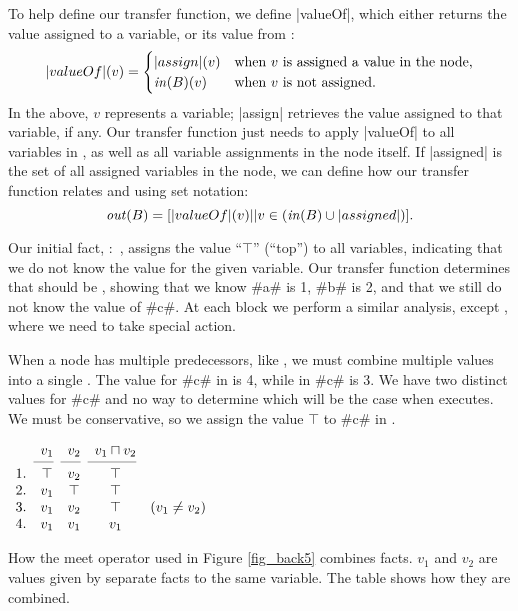 \documentclass[12pt]{report}
\begin{document}
To help define our transfer function, we define |valueOf|,
which either returns the value assigned to a variable, or its value
from \inBa:
\begin{equation} |valueOf|(v) = 
  \begin{cases}
    |assign|(v) & \text{when $v$ is assigned a value in the node,} \\
    \text{\ensuremath{\mathit{in}(B)}}(v) & \text{when $v$ is not assigned.} 
  \end{cases}
\label{eqn_back2}
\end{equation}
In the above, $v$ represents a variable; |assign| retrieves the value
assigned to that variable, if any.  Our transfer function just needs
to apply |valueOf| to all variables in \inBa, as well as all
variable assignments in the node itself. If |assigned| is the set of
all assigned variables in the node, we can define how our transfer
function relates \inBa and \outBa using set notation:
\begin{equation}
  \text{\ensuremath{\mathit{out}(B)}} = [|valueOf|(v) || v \in (\text{\ensuremath{\mathit{in}(B)}} \cup |assigned|)].
\end{equation}

Our initial fact, :~, assigns the value ``$\top$'' (``top'') to all variables,
indicating that we do not know the value for the given variable. Our
transfer function determines that  should be
, showing that we know #a# is 1, #b# is 2, and
that we still do not know the value of #c#. At each block we perform a
similar analysis, except , where we need to
  take special action.

When a node has multiple predecessors, like ,
we must combine multiple \outBa values into a single \inBa. The value
for #c# in  is 4, while in 
#c# is 3. We have two distinct values for #c# and no way to determine
which will be the case when  executes. We
must be conservative, so we assign the value $\top$ to #c# in
.

\begin{table}[tbh]
  \centering
  \figbegin
  \begin{math}
    \begin{array}{ccccc}
      & v_1 & v_2 & v_1 \lub v_2 \\
      \cmidrule(r){2-2}\cmidrule(r){3-3}\cmidrule(r){4-4}
      1. & \top & v_2 & \top & \\ 
      2. & v_1 & \top & \top & \\
      3. & v_1 & v_2 & \top & \text{($v_1 \neq v_2$)}\\
      4. & v_1 & v_1 & v_1 
    \end{array}
  \end{math}
  \caption{How the meet operator used in Figure \ref{fig_back5}
    combines facts. $v_1$ and $v_2$ are values given by separate
    \outBa facts to the same variable. The table shows how they are
    combined.}
  \label{tbl_back2}
  \figend
\end{table}
\end{document}
